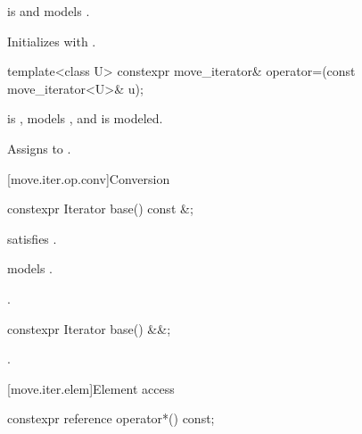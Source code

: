 \begin{itemdescr}
\pnum
\constraints
{} is  and
 models .

\pnum
\effects
Initializes  with .
\end{itemdescr}

%
\begin{itemdecl}
template<class U> constexpr move_iterator& operator=(const move_iterator<U>& u);
\end{itemdecl}

\begin{itemdescr}
\pnum
\constraints
{} is ,
 models , and
 is modeled.

\pnum
\effects
Assigns  to
.
\end{itemdescr}

[move.iter.op.conv]{Conversion}

%
\begin{itemdecl}
constexpr Iterator base() const &;
\end{itemdecl}

\begin{itemdescr}
\pnum
\constraints
{} satisfies .

\pnum
\expects
{} models .

\pnum
\returns
{}.
\end{itemdescr}

%
\begin{itemdecl}
constexpr Iterator base() &&;
\end{itemdecl}

\begin{itemdescr}
\pnum
\returns
{}.
\end{itemdescr}

[move.iter.elem]{Element access}

%
\begin{itemdecl}
constexpr reference operator*() const;
\end{itemdecl}

